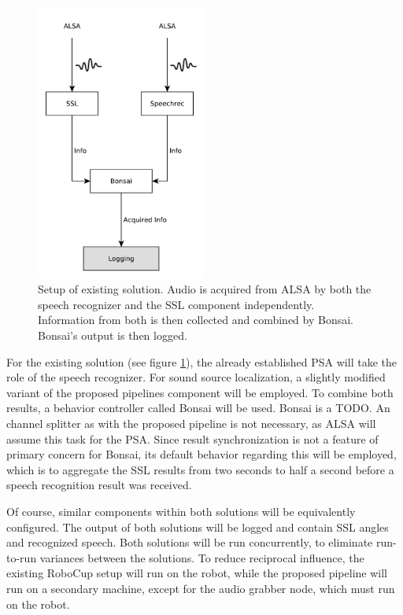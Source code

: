 \begin{figure}[]
	\centering
	\includegraphics[width=0.5\textwidth]{diagrams/eval_task_old.pdf}
	\caption{Setup of existing solution. 
		Audio is acquired from ALSA by both the speech recognizer and the SSL component independently. 
		Information from both is then collected and combined by Bonsai.
		Bonsai's output is then logged.}
	\label{pic:eval_task_setup_old}
\end{figure}

For the existing solution (see figure \ref{pic:eval_task_setup_old}), the already established PSA will take the role of the speech recognizer.
For sound source localization, a slightly modified variant of the proposed pipelines component will be employed.
To combine both results, a behavior controller called Bonsai \cite{bonsai} will be used.
Bonsai is a TODO.
An channel splitter as with the proposed pipeline is not necessary, as ALSA will assume this task for the PSA.
Since result synchronization is not a feature of primary concern for Bonsai, its default behavior regarding this will be employed, which is to aggregate the SSL results from two seconds to half a second before a speech recognition result was received.

Of course, similar components within both solutions will be equivalently configured.
The output of both solutions will be logged and contain SSL angles and recognized speech.
Both solutions will be run concurrently, to eliminate run-to-run variances between the solutions.
To reduce reciprocal influence, the existing RoboCup setup will run on the robot, while the proposed pipeline will run on a secondary machine, except for the audio grabber node, which must run on the robot.

